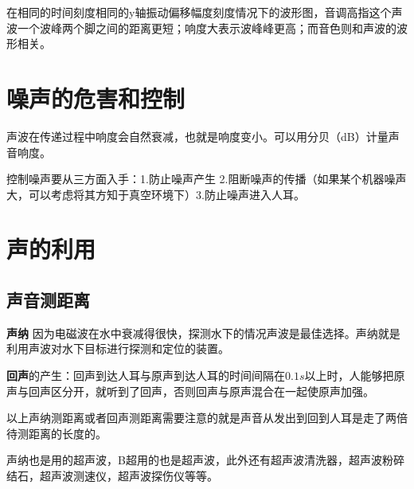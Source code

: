 \documentclass[12pt]{exam}
\begin{document}
在相同的时间刻度相同的y轴振动偏移幅度刻度情况下的波形图，音调高指这个声波一个波峰两个脚之间的距离更短；响度大表示波峰峰更高；而音色则和声波的波形相关。


\section{噪声的危害和控制}
声波在传递过程中响度会自然衰减，也就是响度变小。可以用分贝（dB）计量声音响度。

控制噪声要从三方面入手：1.防止噪声产生 2.阻断噪声的传播（如果某个机器噪声大，可以考虑将其方知于真空环境下）3.防止噪声进入人耳。



\section{声的利用}
\subsection{声音测距离}
\textbf{声纳} 因为电磁波在水中衰减得很快，探测水下的情况声波是最佳选择。声纳就是利用声波对水下目标进行探测和定位的装置。

\textbf{回声}的产生：回声到达人耳与原声到达人耳的时间间隔在$0.1s$以上时，人能够把原声与回声区分开，就听到了回声，否则回声与原声混合在一起使原声加强。

以上声纳测距离或者回声测距离需要注意的就是声音从发出到回到人耳是走了两倍待测距离的长度的。


声纳也是用的超声波，B超用的也是超声波，此外还有超声波清洗器，超声波粉碎结石，超声波测速仪，超声波探伤仪等等。
\end{document}

